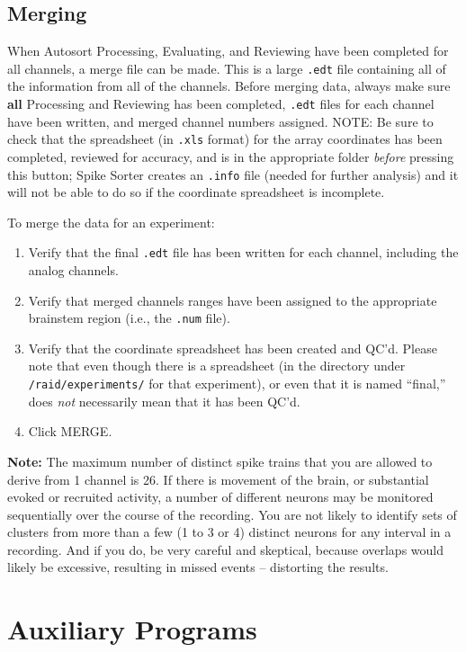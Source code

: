 \documentclass[12pt]{article}
\begin{document}
\subsection{Merging}
When Autosort Processing, Evaluating, and Reviewing have been
completed for all channels, a merge file can be made.  This is a large
{\tt .edt} file containing all of the information from all of the
channels. Before merging data, always make sure \textbf{all}
Processing and Reviewing has been completed, {\tt *.edt} files for
each channel have been written, and merged channel numbers
assigned. NOTE: Be sure to check that the spreadsheet (in {\tt .xls}
format) for the array coordinates has been completed, reviewed for
accuracy, and is in the appropriate folder \textit{before} pressing
this button; Spike Sorter creates an {\tt *.info} file (needed for
further analysis) and it will not be able to do so if the coordinate
spreadsheet is incomplete.

To merge the data for an experiment:

\begin{enumerate}
\item Verify that the final {\tt .edt} file has been written for each
  channel, including the analog channels.
\item Verify that merged channels ranges have been assigned to the
  appropriate brainstem region (i.e., the {\tt *.num} file).
\item Verify that the coordinate spreadsheet has been created and
  QC'd. Please note that even though there is a spreadsheet (in the
  directory under {\tt /raid/experiments/} for that experiment), or
  even that it is named ``final,'' does \emph{not} necessarily mean
  that it has been QC'd.
\item Click {\sf MERGE}.
\end{enumerate}

\textbf{Note:} The maximum number of distinct spike trains that you
are allowed to derive from 1 channel is 26. If there is movement of
the brain, or substantial evoked or recruited activity, a number of
different neurons may be monitored sequentially over the course of the
recording. You are not likely to identify sets of clusters from more
than a few (1 to 3 or 4) distinct neurons for any interval in a
recording. And if you do, be very careful and skeptical, because
overlaps would likely be excessive, resulting in missed events --
distorting the results.

\clearpage
\section{Auxiliary Programs}
\label{aux}
\end{document}
